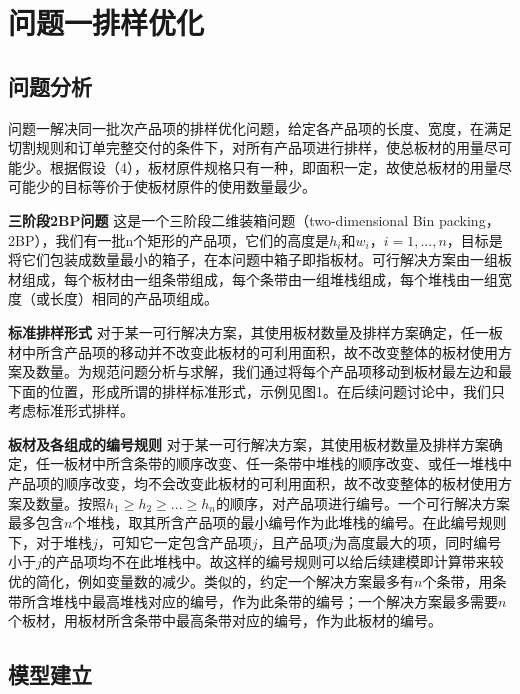 \documentclass[bwprint]{gmcmthesis}
\begin{document}
\section{问题一排样优化}

\subsection{问题分析}

问题一解决同一批次产品项的排样优化问题，给定各产品项的长度、宽度，在满足切割规则和订单完整交付的条件下，对所有产品项进行排样，使总板材的用量尽可能少。根据假设（4），板材原件规格只有一种，即面积一定，故使总板材的用量尽可能少的目标等价于使板材原件的使用数量最少。

\textbf{三阶段2BP问题} \quad 这是一个三阶段二维装箱问题（two-dimensional  {\rm Bin} packing，2BP），我们有一批n个矩形的产品项，它们的高度是$h_i$和$w_i$，$i=1,...,n$，目标是将它们包装成数量最小的箱子，在本问题中箱子即指板材。可行解决方案由一组板材组成，每个板材由一组条带组成，每个条带由一组堆栈组成，每个堆栈由一组宽度（或长度）相同的产品项组成。

\textbf{标准排样形式} \quad 对于某一可行解决方案，其使用板材数量及排样方案确定，任一板材中所含产品项的移动并不改变此板材的可利用面积，故不改变整体的板材使用方案及数量。为规范问题分析与求解，我们通过将每个产品项移动到板材最左边和最下面的位置，形成所谓的排样标准形式，示例见图1。在后续问题讨论中，我们只考虑标准形式排样。


\textbf{板材及各组成的编号规则} \quad 对于某一可行解决方案，其使用板材数量及排样方案确定，任一板材中所含条带的顺序改变、任一条带中堆栈的顺序改变、或任一堆栈中产品项的顺序改变，均不会改变此板材的可利用面积，故不改变整体的板材使用方案及数量。按照$h_1 \geq h_2 \geq ...\geq h_n$的顺序，对产品项进行编号。一个可行解决方案最多包含$n$个堆栈，取其所含产品项的最小编号作为此堆栈的编号。在此编号规则下，对于堆栈$j$，可知它一定包含产品项$j$，且产品项$j$为高度最大的项，同时编号小于$j$的产品项均不在此堆栈中。故这样的编号规则可以给后续建模即计算带来较优的简化，例如变量数的减少。类似的，约定一个解决方案最多有$n$个条带，用条带所含堆栈中最高堆栈对应的编号，作为此条带的编号；一个解决方案最多需要$n$个板材，用板材所含条带中最高条带对应的编号，作为此板材的编号。



\subsection{模型建立}
\end{document}
